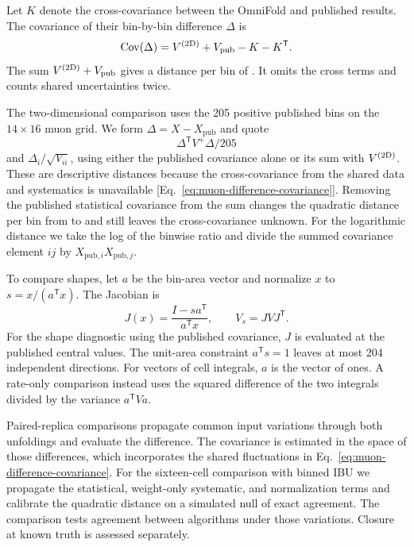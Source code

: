 Let $K$ denote the cross-covariance between the OmniFold and published results. The covariance of their bin-by-bin difference $\Delta$ is
\begin{equation}
  \operatorname{Cov}(\Delta)=V^{(2\mathrm{D})}+V_{\mathrm{pub}}-K-K^{\mathsf T} .
  \label{eq:muon-difference-covariance}
\end{equation}
The sum $V^{(2\mathrm{D})}+V_{\mathrm{pub}}$ gives a distance per bin of \chiCombined{}. It omits the cross terms and counts shared uncertainties twice.

The two-dimensional comparison uses the 205 positive published bins on the $14\times16$ muon grid. We form $\Delta=X-X_{\mathrm{pub}}$ and quote
\begin{equation}
  \Delta^{\mathsf T}V^+\Delta/205
  \label{eq:chi2}
\end{equation}
and $\Delta_i/\sqrt{V_{ii}}$, using either the published covariance alone or its sum with $V^{(2\mathrm{D})}$. These are descriptive distances because the cross-covariance from the shared data and systematics is unavailable [Eq.~\eqref{eq:muon-difference-covariance}]. Removing the published statistical covariance from the sum changes the quadratic distance per bin from \chiCombined{} to \chiCombinedSubStat{} and still leaves the cross-covariance unknown. For the logarithmic distance we take the log of the binwise ratio and divide the summed covariance element $ij$ by $X_{\mathrm{pub},i}X_{\mathrm{pub},j}$.

To compare shapes, let $a$ be the bin-area vector and normalize $x$ to $s=x/(a^{\mathsf T}x)$. The Jacobian is
\begin{equation}
  J(x)=\frac{I-sa^{\mathsf T}}{a^{\mathsf T}x},\qquad
  V_s=JVJ^{\mathsf T} .
  \label{eq:app-shape-jacobian}
\end{equation}
For the shape diagnostic using the published covariance, $J$ is evaluated at the published central values. The unit-area constraint $a^{\mathsf T}s=1$ leaves at most 204 independent directions. For vectors of cell integrals, $a$ is the vector of ones. A rate-only comparison instead uses the squared difference of the two integrals divided by the variance $a^{\mathsf T}V a$.

Paired-replica comparisons propagate common input variations through both unfoldings and evaluate the difference. The covariance is estimated in the space of those differences, which incorporates the shared fluctuations in Eq.~\eqref{eq:muon-difference-covariance}. For the sixteen-cell comparison with binned IBU we propagate the statistical, weight-only systematic, and normalization terms and calibrate the quadratic distance on a simulated null of exact agreement. The comparison tests agreement between algorithms under those variations. Closure at known truth is assessed separately.

